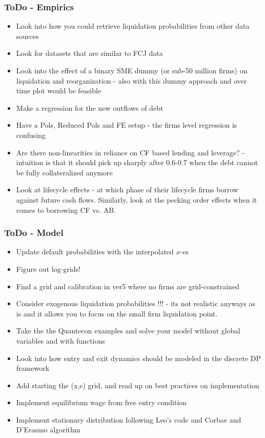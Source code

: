 \documentclass[12pt]{article}
\begin{document}
\subsubsection*{ToDo - Empirics}
\begin{itemize}\setlength\itemsep{0em} \small
    \item Look into how you could retrieve liquidation probabilities from other data sources \checkmark
    \item Look for datasets that are similar to FCJ data
    \item Look into the effect of a binary SME dummy (or sub-50 million firms) on liquidation and reorganization - also with this dummy approach and over time plot would be feasible \checkmark
    \item Make a regression for the new outflows of debt
    \item Have a Pols, Reduced Pols and FE  setup - the firms level regression is confusing
    \item Are there non-linearities in reliance on CF based lending and leverage? - intuition is that it should pick up sharply after 0.6-0.7 when the debt cannot be fully collateralized anymore
    \item Look at lifecycle effects - at which phase of their lifecycle firms borrow against future cash flows. Similarly, look at the pecking order effects when it comes to borrowing CF vs. AB.
\end{itemize} \normalsize

\subsubsection*{ToDo - Model}
\begin{itemize}\setlength\itemsep{0em} \small
    \item Update default probabilities with the interpolated $x$-es \checkmark
    \item Figure out log-grids! \checkmark
    \item Find a grid and calibration in ver5 where no firms are grid-constrained \checkmark
    \item Consider exogenous liquidation probabilities !!! - its not realistic anyways as is and it allows you to focus on the small firm liquidation point.
    \item Take the the Quantecon examples and solve your model without global variables and with functions \checkmark
    \item Look into how entry and exit dynamics should be modeled in the discrete DP framework \checkmark
    \item Add starting the (x,e) grid, and read up on best practices on implementation
    \item Implement equilibrium wage from free entry condition \checkmark
    \item Implement stationary distribution following Leo's code and Corbae and D'Erasmo algorithm
\end{itemize} \normalsize
\end{document}
